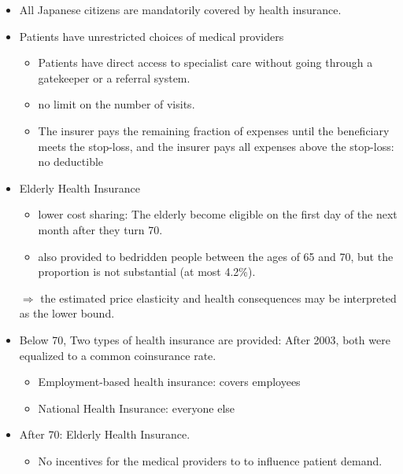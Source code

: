 \documentclass[../root]{subfiles}
\begin{document}
    \begin{itemize}
      \item All Japanese citizens are mandatorily covered by health insurance.
      \item Patients have unrestricted choices of medical providers
      \begin{itemize}
        \item Patients have direct access to specialist care without going through a gatekeeper or a referral system.
        \item no limit on the number of visits.
        \item The insurer pays the remaining fraction of expenses until the beneficiary meets the stop-loss, and the insurer pays all expenses above the stop-loss: no deductible
      \end{itemize}
      \item Elderly Health Insurance
      \begin{itemize}
        \item lower cost sharing: The elderly become eligible on the first day of the next month after they turn 70.
        \item also provided to bedridden people between the ages of 65 and 70, but the proportion is not substantial (at most 4.2\%).
      \end{itemize}
      $\Rightarrow$ the estimated price elasticity and health consequences may be interpreted as the lower bound.
    \end{itemize}

    \begin{itemize}
      \item Below 70, Two types of health insurance are provided: After 2003, both were equalized to a common coinsurance rate.
      \begin{itemize}
        \item Employment-based health insurance: covers employees
        \item National Health Insurance: everyone else
      \end{itemize}
      \item After 70: Elderly Health Insurance.
      \begin{itemize}
        \item No incentives for the medical providers to to influence patient demand.
      \end{itemize}
    \end{itemize}
\end{document}

